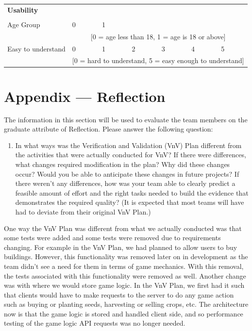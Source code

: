 \documentclass[12pt, titlepage]{article}
\begin{document}
\begin{table}[h]
{\begin{tabular}{|lllllll|}
\multicolumn{7}{|l|}{\textbf{Usability}}  \\
\multicolumn{7}{|l|}{}  
\\ \hline
\multicolumn{1}{|l|}{Age Group}      & \multicolumn{1}{l|}{0} & \multicolumn{1}{l|}{1} & \multicolumn{1}{l}{} & \multicolumn{1}{l}{} & \multicolumn{1}{l}{} &  \\ \hline
\multicolumn{1}{|l|}{}                       & \multicolumn{6}{c|}{{[}0 = age less than 18, 1 = age is 18 or above{]}}                            \\ \hline
\multicolumn{1}{|l|}{Easy to understand}      & \multicolumn{1}{l|}{0} & \multicolumn{1}{l|}{1} & \multicolumn{1}{l|}{2} & \multicolumn{1}{l|}{3} & \multicolumn{1}{l|}{4} & 5 \\ \hline
\multicolumn{1}{|l|}{}                       & \multicolumn{6}{c|}{{[}0 = hard to understand, 5 = easy enough to understand{]}}                            \\ \hline
\end{tabular}}
\end{table}

\newpage{}
\section*{Appendix --- Reflection}

The information in this section will be used to evaluate the team members on the
graduate attribute of Reflection.  Please answer the following question:

\begin{enumerate}
  \item In what ways was the Verification and Validation (VnV) Plan different
  from the activities that were actually conducted for VnV?  If there were
  differences, what changes required modification in the plan?  Why did
  these changes occur?  Would you be able to anticipate these changes in future
  projects?  If there weren't any differences, how was your team able to clearly
  predict a feasible amount of effort and the right tasks needed to build the
  evidence that demonstrates the required quality?  (It is expected that most
  teams will have had to deviate from their original VnV Plan.)
\end{enumerate}

One way the VnV Plan was different from what we actually conducted was that some tests were added and some tests were removed due to requirements changing. For example in the VnV Plan, we had planned to allow users to buy buildings. However, this functionality was removed later on in development as the team didn't see a need for them in terms of game mechanics. With this removal, the tests associated with this functionality were removed as well. Another change was with where we would store game logic. In the VnV Plan, we first had it such that clients would have to make requests to the server to do any game action such as buying or planting seeds, harvesting or selling crops, etc. The architecture now is that the game logic is stored and handled client side, and so performance testing of the game logic API requests was no longer needed.
\end{document}
